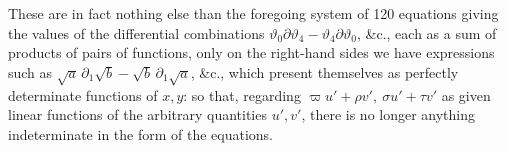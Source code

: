 \documentclass[11pt]{article}
\begin{document}
\medskip
These are in fact nothing else than the foregoing system of 120 equations giving the values of the differential combinations $\vartheta_0\partial\vartheta_4 - \vartheta_4\partial\vartheta_0$, \&c., each as a sum of products of pairs of functions, only on the right-hand sides we have expressions such as $\sqrt{a}\,\partial_1\sqrt{b} - \sqrt{b}\,\partial_1\sqrt{a}$, \&c., which present themselves as perfectly determinate functions of $x, y$: so that, regarding $\varpi u' + \rho v',\ \sigma u' + \tau v'$ as given linear functions of the arbitrary quantities $u', v'$, there is no longer anything indeterminate in the form of the equations.
\end{document}
